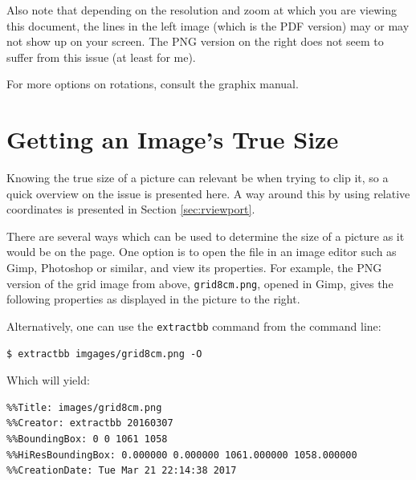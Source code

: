 \documentclass[a4paper,11pt]{article}
\newcommand\code[1]{\texttt{#1}}
\begin{document}
Also note that depending  on the resolution and zoom at  which you are viewing
this document, the lines  in the left image (which is the  PDF version) may or
may not show up on your screen. The PNG  version on the right does not seem to
suffer from this issue (at least for me).

For more options on rotations, consult the graphix manual.


\section{Getting an Image's True Size}
\label{sec:true-size}

\begin{minipage}[t][][b]{0.65\textwidth}
    Knowing the true size of a picture can relevant be when trying to clip it,
    so a quick overview  on the issue is presented here. A  way around this by
    using relative coordinates is presented in Section \ref{sec:rviewport}.

    There  are several  ways which  can be  used to  determine the  size of  a
    picture as  it would be  on the  page. One option is  to open the  file in
    an  image  editor  such  as  Gimp, Photoshop  or  similar,  and  view  its
    properties. For example,  the PNG  version of the  grid image  from above,
    \code{grid8cm.png},  opened in  Gimp,  gives the  following properties  as
    displayed in the picture to the right.

    Alternatively, one can  use the \code{extractbb} command  from the command
    line:
    \begin{verbatim}
$ extractbb imgages/grid8cm.png -O
    \end{verbatim}

    Which will yield:
    \begin{verbatim}
%%Title: images/grid8cm.png
%%Creator: extractbb 20160307
%%BoundingBox: 0 0 1061 1058
%%HiResBoundingBox: 0.000000 0.000000 1061.000000 1058.000000
%%CreationDate: Tue Mar 21 22:14:38 2017
    \end{verbatim}
\end{minipage}
\hfill
\end{document}
